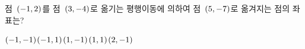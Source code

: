 점~$(-1{,}\mkern3mu\mathopen{}2)$를 점~$(3{,}\mkern3mu\mathopen{}-4)$로 옮기는 평행이동에 의하여 점~$(5{,}\mkern3mu\mathopen{}-7)$로 옮겨지는 점의 좌표는?
\begin{choices32}{$(-1{,}\mkern3mu\mathopen{}-1)$}{$(-1{,}\mkern3mu\mathopen{}1)$}{$(1{,}\mkern3mu\mathopen{}-1)$}{$(1{,}\mkern3mu\mathopen{}1)$}{$(2{,}\mkern3mu\mathopen{}-1)$}\end{choices32}
